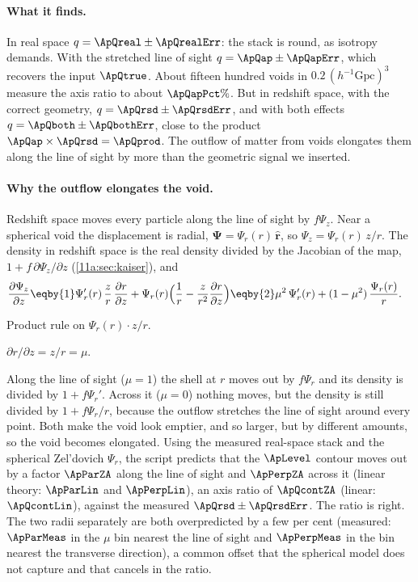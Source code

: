 \paragraph{What it finds.}
In real space $q=\ApQreal\pm\ApQrealErr$: the stack is round, as isotropy demands.
With the stretched line of sight $q=\ApQap\pm\ApQapErr$, which recovers the input
$\ApQtrue$. About fifteen hundred voids in $0.2\,(h^{-1}\mathrm{Gpc})^3$ measure
the axis ratio to about $\ApQapPct\%$. But in redshift space, with the correct geometry,
$q=\ApQrsd\pm\ApQrsdErr$, and with both effects $q=\ApQboth\pm\ApQbothErr$, close to
the product $\ApQap\times\ApQrsd=\ApQprod$. The outflow of matter from voids
elongates them along the line of sight by more than the geometric signal we
inserted.

\paragraph{Why the outflow elongates the void.}
Redshift space moves every particle along the line of sight by $f\Psi_z$. Near a
spherical void the displacement is radial, $\bm\Psi=\Psi_r(r)\,\hat{\bm r}$, so
$\Psi_z=\Psi_r(r)\,z/r$. The density in redshift space is the real density divided
by the Jacobian of the map, $1+f\,\partial\Psi_z/\partial z$
(\cref{11a:sec:kaiser}), and
\begin{align}
  \frac{\partial\Psi_z}{\partial z}
  &\eqby{1}\Psi_r'(r)\,\frac{z}{r}\,\frac{\partial r}{\partial z}
   +\Psi_r(r)\Bigl(\frac1r-\frac{z}{r^2}\frac{\partial r}{\partial z}\Bigr)
   \eqby{2}\mu^2\,\Psi_r'(r)+(1-\mu^2)\,\frac{\Psi_r(r)}{r}.
  \label{11b:eq:void-jac}
\end{align}
\begin{explain}
  \item Product rule on $\Psi_r(r)\cdot z/r$.
  \item $\partial r/\partial z=z/r=\mu$.
\end{explain}
Along the line of sight ($\mu=1$) the shell at $r$ moves out by $f\Psi_r$ and its
density is divided by $1+f\Psi_r'$. Across it ($\mu=0$) nothing moves, but the
density is still divided by $1+f\Psi_r/r$, because the outflow stretches the line
of sight around every point. Both make the void look emptier, and so larger, but by
different amounts, so the void becomes elongated. Using the measured real-space
stack and the spherical Zel'dovich $\Psi_r$, the script predicts that the
$\ApLevel$ contour moves out by a factor $\ApParZA$ along the line of sight and
$\ApPerpZA$ across it (linear theory: $\ApParLin$ and $\ApPerpLin$), an axis ratio of
$\ApQcontZA$ (linear: $\ApQcontLin$), against the measured $\ApQrsd\pm\ApQrsdErr$.
The ratio is right. The two radii separately are both overpredicted by a few per
cent (measured: $\ApParMeas$ in the $\mu$ bin nearest the line of sight and
$\ApPerpMeas$ in the bin nearest the transverse direction), a common offset that
the spherical model does not capture and that cancels in the ratio.

